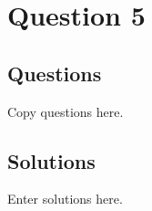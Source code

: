 \chapter{Question 5}
\section{Questions}
Copy questions here.

\section{Solutions}
Enter solutions here.
